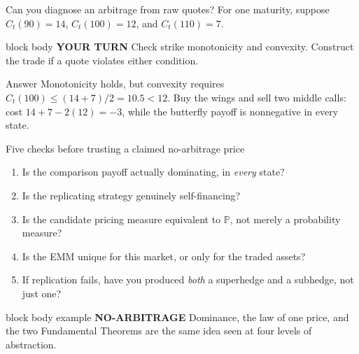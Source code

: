 \documentclass[handout,10pt,aspectratio=169]{beamer}
\newenvironment{marketbox}{\begin{beamercolorbox}[rounded=true,sep=0.7em,wd=\textwidth]{block body example}
  \textbf{\color{CourseGreen}NO-ARBITRAGE}\quad}{\end{beamercolorbox}}
\newenvironment{pausebox}{\begin{beamercolorbox}[rounded=true,sep=0.8em,wd=\textwidth]{block body}
  \textbf{\color{CourseGold}YOUR TURN}\quad}{\end{beamercolorbox}}
\newcommand{\Pp}{\mathbb P}
\newcommand{\1}{\mathbf 1}
\begin{document}
\begin{frame}{Can you diagnose an arbitrage from raw quotes?}
For one maturity, suppose \(C_t(90)=14\), \(C_t(100)=12\), and
\(C_t(110)=7\).
\begin{pausebox}
Check strike monotonicity and convexity. Construct the trade if a quote
violates either condition.
\end{pausebox}

\begin{exampleblock}{Answer}
Monotonicity holds, but convexity requires
\(C_t(100)\leq(14+7)/2=10.5<12\).
Buy the wings and sell two middle calls: cost \(14+7-2(12)=-3\), while the
butterfly payoff is nonnegative in every state.
\end{exampleblock}
\end{frame}





\begin{frame}{Five checks before trusting a claimed no-arbitrage price}
\begin{enumerate}
  \item Is the comparison payoff actually dominating, in \emph{every} state?
  \item Is the replicating strategy genuinely self-financing?
  \item Is the candidate pricing measure equivalent to \(\Pp\), not merely a
        probability measure?
  \item Is the EMM unique for this market, or only for the traded assets?
  \item If replication fails, have you produced \emph{both} a superhedge and
        a subhedge, not just one?
\end{enumerate}
\begin{marketbox}
Dominance, the law of one price, and the two Fundamental Theorems are the
same idea seen at four levels of abstraction.
\end{marketbox}
\end{frame}
\end{document}
